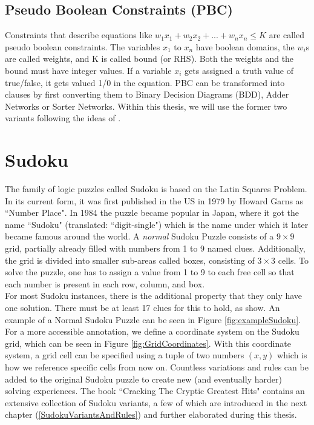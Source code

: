 \subsection{Pseudo Boolean Constraints (PBC)}
Constraints that describe equations like $w_1x_1+w_2x_2+...+w_nx_n \leq K$ are called pseudo boolean constraints. The variables $x_1$ to $x_n$ have boolean domains, the $w_i$s are called weights, and K is called bound (or RHS). Both the weights and the bound must have integer values. If a variable $x_i$ gets assigned a truth value of true/false, it gets valued 1/0 in the equation. PBC can be transformed into clauses by first converting them to Binary Decision Diagrams (BDD), Adder Networks or Sorter Networks. Within this thesis, we will use the former two variants following the ideas of \cite{Een2006TranslatingPC}.

\section{Sudoku}\label{NormalSudoku}
The family of logic puzzles called Sudoku is based on the Latin Squares Problem. In its current form, it was first published in the US in 1979 by Howard Garns as ``Number Place". In 1984 the puzzle became popular in Japan,  where it got the name ``Sudoku" (translated: ``digit-single") which is the name under which it later became famous around the world.
A \emph{normal} Sudoku Puzzle consists of a $9\times9$ grid, partially already filled with numbers from 1 to 9 named clues. Additionally, the grid is divided into smaller sub-areas called boxes, consisting of  $3\times3$ cells. To solve the puzzle, one has to assign a value from 1 to 9 to each free cell so that each number is present in each row, column, and box.\\
For most Sudoku instances, there is the additional property that they only have one solution. There must be at least 17 clues for this to hold, as \citet{https://doi.org/10.48550/arxiv.1201.0749} show. An example of a Normal Sudoku Puzzle can be seen in Figure \ref{fig:exampleSudoku}. For a more accessible annotation, we define a coordinate system on the Sudoku grid, which can be seen in Figure \ref{fig:GridCoordinates}. With this coordinate system, a grid cell can be specified using a tuple of two numbers $(x,y)$ which is how we reference specific cells from now on. Countless variations and rules can be added to the original Sudoku puzzle to create new (and eventually harder) solving experiences. The book ``Cracking The Cryptic Greatest Hits" \cite{CrackingTheCryptic2021} contains an extensive collection of Sudoku variants, a few of which are introduced in the next chapter (\ref{SudokuVariantsAndRules}) and further elaborated during this thesis.

